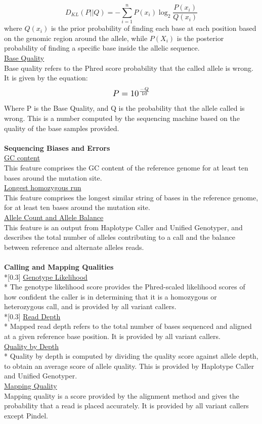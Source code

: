 \documentclass{article}
\begin{document}
\begin{equation}
D_{KL}(P||Q) = -\sum_{i=1}^{n}P(x_i)\log_{2}{\frac{P(x_i)}{Q(x_i)}}
\end{equation}
where $Q(x_i)$ is the prior probability of finding each base at each position based on the genomic region around the allele, while $P(X_i)$ is the posterior probability of finding a specific base inside the allelic sequence.\\[0.3\baselineskip]
\underline{Base Quality}\\
Base quality refers to the Phred score probability that the called allele is wrong. It is given by the equation:
\[ \scalebox{1.2}{$P=10^{\frac{-Q}{10}}$} \]
Where P is the Base Quality, and Q is the probability that the allele called is wrong. This is a number computed by the sequencing machine based on the quality of the base samples provided.\\\\
\textbf{Sequencing Biases and Errors} \\[0.3\baselineskip]
\underline{GC content}\\
This feature comprises the GC content of the reference genome for at least ten bases around the mutation site.\\[0.3\baselineskip]
\underline{Longest homozygous run}\\
This feature comprises the longest similar string of bases in the reference genome, for at least ten bases around the mutation site.\\[0.3\baselineskip]
\underline{Allele Count and Allele Balance}\\
This feature is an output from Haplotype Caller and Unified Genotyper, and describes the total number of alleles contributing to a call and the balance between reference and alternate alleles reads.\\\\
\textbf{Calling and Mapping Qualities} \\*[0.3\baselineskip]
\underline{Genotype Likelihood}\\*
The genotype likelihood score provides the Phred-scaled likelihood scores of how confident the caller is in determining that it is a homozygous or heterozygous call, and is provided by all variant callers.\\*[0.3\baselineskip]
\underline{Read Depth}\\*
Mapped read depth refers to the total number of bases sequenced and aligned at a given reference base position. It is provided by all variant callers.\\[0.3\baselineskip]
\underline{Quality by Depth}\\*
Quality by depth is computed by dividing the quality score against allele depth, to obtain an average score of allele quality. This is provided by Haplotype Caller and Unified Genotyper.\\[0.3\baselineskip]
\underline{Mapping Quality}\\
Mapping quality is a score provided by the alignment method and gives the probability that a read is placed accurately. It is provided by all variant callers except Pindel.\\
\end{document}
